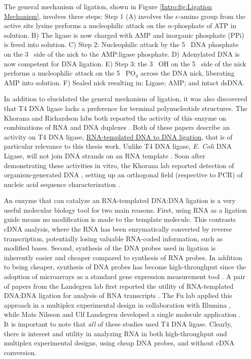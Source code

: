     The general mechanism of ligation, shown in Figure \ref{Intro:fig:Ligation Mechanism}, involves three steps: Step 1 (A) involves the $\epsilon$-amino group from the active site lysine performs a nucleophilic attack on the $\alpha$-phosphate of ATP in solution.  B) The ligase is now charged with AMP and inorganic phosphate (PPi) is freed into solution. C) Step 2: Nucleophilic attack by the 5\textprime~ DNA phosphate on the 3\textprime~ side of the nick to the AMP:ligase phosphate. D) Adenylated DNA is now competent for DNA ligation. E) Step 3: the 3\textprime~ OH on the 5\textprime~ side of the nick performs a nucleophilic attack on the 5\textprime~ PO$_{4}$ across the DNA nick, liberating AMP into solution. F) Sealed nick resulting in: Ligase; AMP; and intact dsDNA.

    In addition to elucidated the general mechanism of ligation, it was also discovered that T4 DNA ligase lacks a preference for terminal polynucleotide structures. The Khorana and Richardson labs both reported the activity of this enzyme on combinations of RNA and DNA duplexes \citep{Fareed1971, Kleppe1970b}. Both of these papers describe an activity on T4 DNA ligase, \underline{RNA-templated DNA to DNA ligation}, that is of particular relevance to this thesis work. Unlike T4 DNA ligase, \textit{E. Coli} DNA Ligase, will not join DNA strands on an RNA template \citep{Bullard2006}. Soon after demonstrating these activities in vitro, the Khorana lab reported detection of organism-generated DNA \citep{Besmer1972b}, setting up an orthogonal field (respective to PCR) of nucleic acid sequence characterization \citep{Conze2009c}.

    An enzyme that can catalyze an RNA-templated DNA:DNA ligation is a very useful molecular biology tool for two main reasons. First, using RNA as a ligation guide means no modification is made to the template molecule. This contrasts cDNA analysis, where the RNA has been enzymatically converted by reverse transcription, potentially losing valuable RNA-coded information, such as modified bases. Second, synthesis of the DNA probes used in ligation is inherently easier and cheaper compared to synthesis of RNA probes. In addition to being cheaper, synthesis of DNA probes has become high-throughput since the adoption of microarrays as a standard gene expression measurement tool \citep{Schena1995a}. A pair of papers from the Landegren lab first reported the utility of RNA-templated DNA:DNA ligation for analysis of RNA transcripts \citep{Nilsson2000,Nilsson2001}. The Fu lab applied this approach in a multiplex experimental design in collaboration with Illumina \citep{Li2012c,Yeakley2002}, while Mats Nilsson and Ulf Landegren developed a single molecule application \citep{Conze2010}. It is important to note that \textit{all} of these studies used T4 DNA ligase. Clearly, there is interest and utility in analyzing RNA in both high-throughput and multiplex experimental designs, using cheap DNA probes, and without cDNA conversion.

